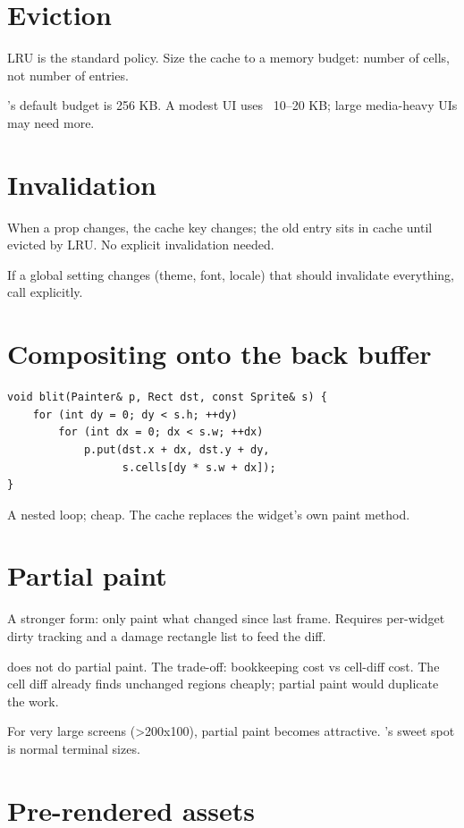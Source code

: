 \section{Eviction}

LRU is the standard policy. Size the cache to a memory
budget: number of cells, not number of entries.

\maya{}'s default budget is 256 KB. A modest UI uses
~10--20 KB; large media-heavy UIs may need more.

\section{Invalidation}

When a prop changes, the cache key changes; the old entry
sits in cache until evicted by LRU. No explicit
invalidation needed.

If a global setting changes (theme, font, locale) that
should invalidate everything, call 
explicitly.

\section{Compositing onto the back buffer}

\begin{lstlisting}
void blit(Painter& p, Rect dst, const Sprite& s) {
    for (int dy = 0; dy < s.h; ++dy)
        for (int dx = 0; dx < s.w; ++dx)
            p.put(dst.x + dx, dst.y + dy,
                  s.cells[dy * s.w + dx]);
}
\end{lstlisting}

A nested loop; cheap. The cache replaces the widget's own
paint method.

\section{Partial paint}

A stronger form: only paint what changed since last frame.
Requires per-widget dirty tracking and a damage rectangle
list to feed the diff.

\maya{} does not do partial paint. The trade-off:
bookkeeping cost vs cell-diff cost. The cell diff already
finds unchanged regions cheaply; partial paint would
duplicate the work.

For very large screens (>200x100), partial paint becomes
attractive. \maya{}'s sweet spot is normal terminal sizes.

\section{Pre-rendered assets}

